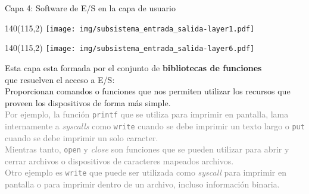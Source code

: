 \documentclass[aspectratio=169]{beamer}
\begin{document}
\begin{frame}{Capa 4: Software de E/S en la capa de usuario}
    \begin{textblock}{140}(115,2) \texttt{[image: img/subsistema\_entrada\_salida-layer1.pdf]} \end{textblock}
    \begin{textblock}{140}(115,2) \texttt{[image: img/subsistema\_entrada\_salida-layer6.pdf]} \end{textblock}
    Esta capa esta formada por el conjunto de \textbf{bibliotecas de funciones}\\
    que resuelven el acceso a E/S:\\
    \bigskip
    Proporcionan comandos o funciones que nos permiten utilizar los recursos que proveen los dispositivos de forma más simple.\\
    \bigskip
    \small
    \textcolor{gray}{Por ejemplo, la función \texttt{printf} que se utiliza para imprimir en pantalla,
    lama internamente a \emph{syscalls} como \texttt{write} cuando se debe imprimir un texto largo o \texttt{put} cuando se debe imprimir un solo caracter.}\\
    \medskip
    \textcolor{gray}{Mientras tanto, \texttt{open} y \emph{close} son funciones que se pueden utilizar para abrir y cerrar archivos o dispositivos de caracteres mapeados archivos.}\\
    \medskip
    \textcolor{gray}{Otro ejemplo es \texttt{write} que puede ser utilizada como \emph{syscall} para imprimir en pantalla o para imprimir dentro de un archivo, incluso información binaria.}\\
\end{frame}
\end{document}
